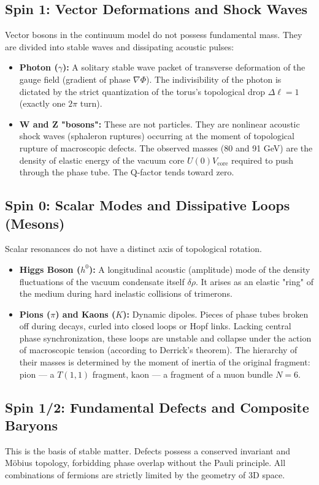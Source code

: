 \documentclass[11pt,a4paper]{article}
\begin{document}
\subsection{Spin 1: Vector Deformations and Shock Waves}
Vector bosons in the continuum model do not possess fundamental mass. They are divided into stable waves and dissipating acoustic pulses:
\begin{itemize}
    \item \textbf{Photon ($\gamma$):} A solitary stable wave packet of transverse deformation of the gauge field (gradient of phase $\nabla \Phi$). The indivisibility of the photon is dictated by the strict quantization of the torus's topological drop $\Delta \ell = 1$ (exactly one $2\pi$ turn).
    \item \textbf{W and Z "bosons":} These are not particles. They are nonlinear acoustic shock waves (sphaleron ruptures) occurring at the moment of topological rupture of macroscopic defects. The observed masses (80 and 91 GeV) are the density of elastic energy of the vacuum core $U(0)V_{\text{core}}$ required to push through the phase tube. The Q-factor tends toward zero.
\end{itemize}

\subsection{Spin 0: Scalar Modes and Dissipative Loops (Mesons)}
Scalar resonances do not have a distinct axis of topological rotation.
\begin{itemize}
    \item \textbf{Higgs Boson ($h^0$):} A longitudinal acoustic (amplitude) mode of the density fluctuations of the vacuum condensate itself $\delta \rho$. It arises as an elastic "ring" of the medium during hard inelastic collisions of trimerons. 
    \item \textbf{Pions ($\pi$) and Kaons ($K$):} Dynamic dipoles. Pieces of phase tubes broken off during decays, curled into closed loops or Hopf links. Lacking central phase synchronization, these loops are unstable and collapse under the action of macroscopic tension (according to Derrick's theorem). The hierarchy of their masses is determined by the moment of inertia of the original fragment: pion — a $T(1,1)$ fragment, kaon — a fragment of a muon bundle $N=6$.
\end{itemize}

\subsection{Spin 1/2: Fundamental Defects and Composite Baryons}
This is the basis of stable matter. Defects possess a conserved invariant and Möbius topology, forbidding phase overlap without the Pauli principle. All combinations of fermions are strictly limited by the geometry of 3D space.
\end{document}
